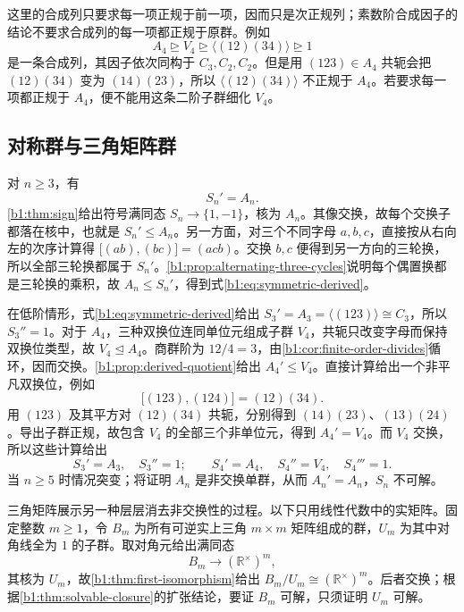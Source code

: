 这里的合成列只要求每一项正规于前一项，因而只是次正规列；素数阶合成因子的结论不要求合成列的每一项都正规于原群。例如
\[
	A_4\trianglerighteq V_4 \trianglerighteq\bigl\langle(12)(34)\bigr\rangle \trianglerighteq1
\]
是一条合成列，其因子依次同构于 \(C_3,C_2,C_2\)。但是用 \((123)\in A_4\) 共轭会把 \((12)(34)\) 变为 \((14)(23)\)，所以 \(\bigl\langle(12)(34)\bigr\rangle\) 不正规于 \(A_4\)。若要求每一项都正规于 \(A_4\)，便不能用这条二阶子群细化 \(V_4\)。

\subsection{对称群与三角矩阵群}
\label{b1:subsec:0702:03}

对 \(n\ge3\)，有
\begin{equation}\label{b1:eq:symmetric-derived}
	S_n'=A_n.
\end{equation}
\cref{b1:thm:sign}给出符号满同态 \(S_n\to\{1,-1\}\)，核为 \(A_n\)。其像交换，故每个交换子都落在核中，也就是 \(S_n'\le A_n\)。另一方面，对三个不同字母 \(a,b,c\)，直接按从右向左的次序计算得 \(\bigl[(ab),(bc)\bigr]=(acb)\)。交换 \(b,c\) 便得到另一方向的三轮换，所以全部三轮换都属于 \(S_n'\)。\cref{b1:prop:alternating-three-cycles}说明每个偶置换都是三轮换的乘积，故 \(A_n\le S_n'\)，得到式\eqref{b1:eq:symmetric-derived}。

\ProseParagraphBreak
在低阶情形，式\eqref{b1:eq:symmetric-derived}给出 \(S_3'=A_3=\bigl\langle(123)\bigr\rangle\cong C_3\)，所以 \(S_3''=1\)。对于 \(A_4\)，三种双换位连同单位元组成子群 \(V_4\)，共轭只改变字母而保持双换位类型，故 \(V_4\trianglelefteq A_4\)。商群阶为 \(12/4=3\)，由\cref{b1:cor:finite-order-divides}循环，因而交换。\cref{b1:prop:derived-quotient}给出 \(A_4'\le V_4\)。直接计算给出一个非平凡双换位，例如
\[
	\bigl[(123),(124)\bigr]=(12)(34).
\]
用 \((123)\) 及其平方对 \((12)(34)\) 共轭，分别得到 \((14)(23)\)、\((13)(24)\)。导出子群正规，故包含 \(V_4\) 的全部三个非单位元，得到 \(A_4'=V_4\)。而 \(V_4\) 交换，所以这些计算给出
\begin{equation}\label{b1:eq:small-symmetric-derived}
	S_3'=A_3,\quad S_3''=1;\qquad S_4'=A_4,\quad S_4''=V_4,\quad S_4'''=1.
\end{equation}
当 \(n\ge5\) 时情况突变；将证明 \(A_n\) 是非交换单群，从而 \(A_n'=A_n\)，\(S_n\) 不可解。

\ProseParagraphBreak
三角矩阵展示另一种层层消去非交换性的过程。以下只用线性代数中的实矩阵。固定整数 \(m\ge1\)，令 \(B_m\) 为所有可逆实上三角 \(m\times m\) 矩阵组成的群，\(U_m\) 为其中对角线全为 \(1\) 的子群。取对角元给出满同态
\[
	B_m\longrightarrow(\mathbb R^\times)^m,
\]
其核为 \(U_m\)，故\cref{b1:thm:first-isomorphism}给出 \(B_m/U_m\cong(\mathbb R^\times)^m\)。后者交换；根据\cref{b1:thm:solvable-closure}的扩张结论，要证 \(B_m\) 可解，只须证明 \(U_m\) 可解。

